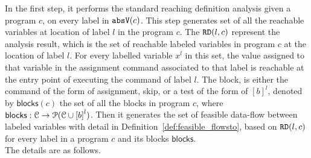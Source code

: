 In the first step, 
it performs the standard reaching definition analysis given a program $c$, 
on 
every label in $\mathtt{abs}{\mathtt{V}}(c)$.  This step generates set of all the reachable variables at location of label $l$ in the program $c$.
The $\mathtt{RD}(l, c)$ represent the analysis result, which is the set of 
reachable labeled variables in program $c$ at the location of label $l$.
For every labelled variable $x^l$ in this set, 
the value assigned to that variable
in the assignment command associated to that label is reachable at the entry point of  executing the command of label $l$.
The block, 
is either the command of the form of assignment, skip, or a test of the form of $[b]^{l}$, 
denoted by $\mathsf{blocks}(c)$
the set of all the blocks 
in program $c$, where  $\mathsf{blocks}: \cdom \to \mathcal{P}(\cdom \cup \clabel{\bexpr}^{l})$.
Then it generates the set of feasible data-flow between labeled variables with detail in Definition~\ref{def:feasible_flowsto}, 
based on $\mathtt{RD}(l, c)$ for every label in a program $c$ and its blocks $\mathsf{blocks}$.
\\
The details are as follows.
%
